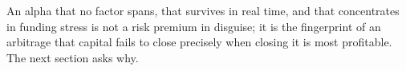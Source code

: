 An alpha that no factor spans, that survives in real time, and that
concentrates in funding stress is not a risk premium in disguise; it is the
fingerprint of an arbitrage that capital fails to close precisely when closing
it is most profitable. The next section asks why.


